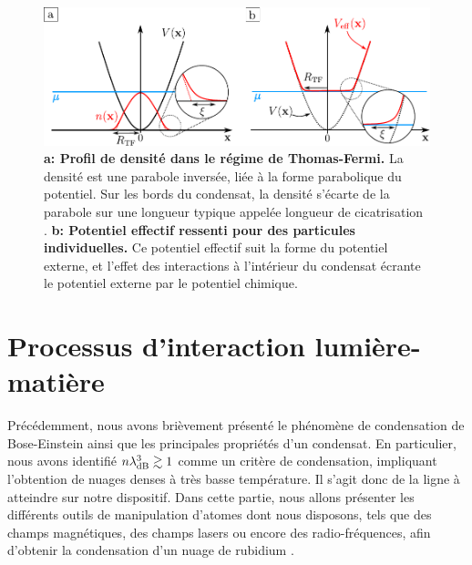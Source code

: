 \begin{figure}
\centering
\includegraphics[width=\textwidth]{Fig/BEC_manip/thomas_fermi.pdf}
\caption{\textbf{a: Profil de densité dans le régime de Thomas-Fermi.} La densité est une parabole inversée, liée à la forme parabolique du potentiel. Sur les bords du condensat, la densité s'écarte de la parabole sur une longueur typique appelée longueur de cicatrisation \protect\footnotemark. \textbf{b: Potentiel effectif ressenti pour des particules individuelles.} Ce potentiel effectif suit la forme du potentiel externe, et l'effet des interactions à l'intérieur du condensat écrante le potentiel externe par le potentiel chimique.}
\label{fig:thomas_fermi}
\end{figure}








\section{Processus d'interaction lumière-matière}
Précédemment, nous avons brièvement présenté le phénomène de condensation de Bose-Einstein ainsi que les principales propriétés d'un condensat. En particulier, nous avons identifié $n \lambda_{\mathrm{dB}}^3 \gtrsim 1$ comme un critère de condensation, impliquant l'obtention de nuages denses à très basse température. Il s'agit donc de la ligne à atteindre sur notre dispositif. Dans cette partie, nous allons présenter les différents outils de manipulation d'atomes dont nous disposons, tels que des champs magnétiques, des champs lasers ou encore des radio-fréquences, afin d'obtenir la condensation d'un nuage de rubidium .
